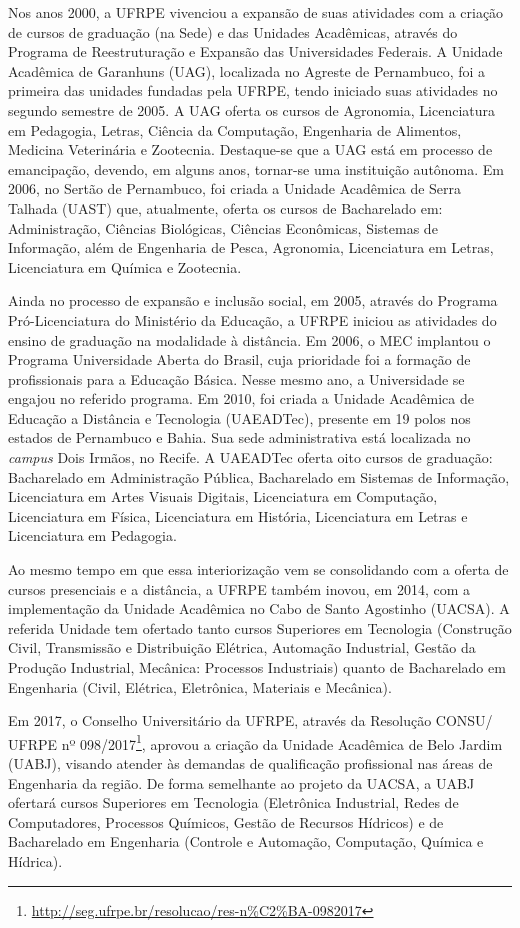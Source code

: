 \documentclass[
	12pt,				%
	openright,			%
  oneside,     %
	a4paper,			%
	chapter=TITLE,		%
	english,			%
	french,				%
	spanish,			%
	brazil				%
	]{abntex2}
\begin{document}
Nos anos 2000, a UFRPE vivenciou a expansão de suas atividades com a criação de cursos de graduação (na Sede) e das Unidades Acadêmicas, através do Programa de Reestruturação e Expansão das Universidades Federais. A Unidade Acadêmica de Garanhuns (UAG), localizada no Agreste de Pernambuco, foi a primeira das unidades fundadas pela UFRPE, tendo iniciado suas atividades no segundo semestre de 2005. A UAG oferta os cursos de Agronomia, Licenciatura em Pedagogia, Letras, Ciência da Computação, Engenharia de Alimentos, Medicina Veterinária e Zootecnia. Destaque-se que a UAG está em processo de emancipação, devendo, em alguns anos, tornar-se uma instituição autônoma. Em 2006, no Sertão de Pernambuco, foi criada a Unidade Acadêmica de Serra Talhada (UAST) que, atualmente, oferta os cursos de Bacharelado em: Administração, Ciências Biológicas, Ciências Econômicas, Sistemas de Informação, além de Engenharia de Pesca, Agronomia, Licenciatura em Letras, Licenciatura em Química e Zootecnia.

Ainda no processo de expansão e inclusão social, em 2005, através do Programa Pró-Licenciatura do Ministério da Educação, a UFRPE iniciou as atividades do ensino de graduação na modalidade à distância. Em 2006, o MEC implantou o Programa Universidade Aberta do Brasil, cuja prioridade foi a formação de profissionais para a Educação Básica. Nesse mesmo ano, a Universidade se engajou no referido programa. Em 2010, foi criada a Unidade Acadêmica de Educação a Distância e Tecnologia (UAEADTec), presente em 19 polos nos estados de Pernambuco e Bahia. Sua sede administrativa está localizada no \textit{campus} Dois Irmãos, no Recife. A UAEADTec oferta oito cursos de graduação: Bacharelado em Administração Pública, Bacharelado em Sistemas de Informação, Licenciatura em Artes Visuais Digitais, Licenciatura em Computação, Licenciatura em Física, Licenciatura em História, Licenciatura em Letras e Licenciatura em Pedagogia.

Ao mesmo tempo em que essa interiorização vem se consolidando com a oferta de cursos presenciais e a distância, a UFRPE também inovou, em 2014, com a implementação da Unidade Acadêmica no Cabo de Santo Agostinho (UACSA). A referida Unidade tem ofertado tanto cursos Superiores em Tecnologia (Construção Civil, Transmissão e Distribuição Elétrica, Automação Industrial, Gestão da Produção Industrial, Mecânica: Processos Industriais) quanto de Bacharelado em Engenharia (Civil, Elétrica, Eletrônica, Materiais e Mecânica).

Em 2017, o Conselho Universitário da UFRPE, através da Resolução CONSU/ UFRPE nº 098/2017\footnote{\url{http://seg.ufrpe.br/resolucao/res-n\%C2\%BA-0982017}}, aprovou a criação da Unidade Acadêmica de Belo Jardim (UABJ), visando atender às demandas de qualificação profissional nas áreas de Engenharia da região. De forma semelhante ao projeto da UACSA, a UABJ ofertará cursos Superiores em Tecnologia (Eletrônica Industrial, Redes de Computadores, Processos Químicos, Gestão de Recursos Hídricos) e de Bacharelado em Engenharia (Controle e Automação, Computação, Química e Hídrica).
\end{document}
